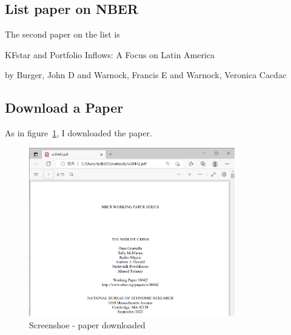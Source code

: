 \subsection{List paper on NBER}

The second paper on the list is 

\begin{displayquote}
    KFstar and Portfolio Inflows: A Focus on Latin America 

    by Burger, John D and Warnock, Francis E and Warnock, Veronica Cacdac
\end{displayquote}

\subsection{Download a Paper}
As in figure~\ref{fig:download_nber}, I downloaded the paper.

\begin{figure}[h]
    \centering
    \includegraphics[width = 0.8\textwidth]{image/NBER_2.png}
    \caption{Screenshoe - paper downloaded}
    \label{fig:download_nber}
\end{figure}

